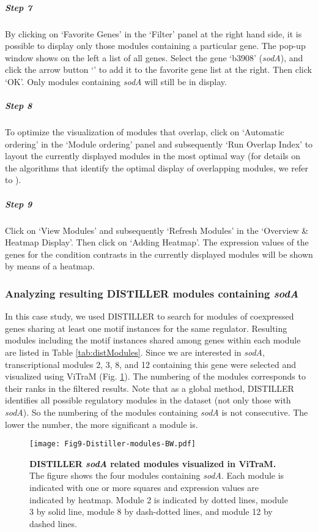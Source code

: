 \begin{small}
\subparagraph{Step 7} By clicking on `Favorite Genes' in the `Filter' panel 
at the right hand side, it is possible to display only those modules containing
a particular gene.
%
The pop-up window shows on the left a list of all genes. Select the gene
`b3908' (\textit{sodA}), and click the arrow button `\textrightarrow' to add it
to the favorite gene list at the right.  Then click `OK'.  Only modules
containing \textit{sodA} will still be in display.

\subparagraph{Step 8} To optimize the visualization of modules that overlap, 
click on `Automatic ordering' in the `Module ordering' panel and subsequently
`Run Overlap Index' to layout the currently displayed modules in the most
optimal way (for details on the algorithms that identify the optimal display of
overlapping modules, we refer to \cite{Sun2009}).

\subparagraph{Step 9} Click on `View Modules' and subsequently `Refresh 
Modules' in the `Overview \& Heatmap Display'. Then click on `Adding Heatmap'. 
The expression values of the genes for the condition contrasts in the currently 
displayed modules will be shown by means of a heatmap.

\end{small} %


\subsubsection{Analyzing resulting DISTILLER modules containing \textit{sodA}}

In this case study, we used DISTILLER to search for modules of coexpressed
genes sharing at least one motif instances for the same regulator.  Resulting
modules including the motif instances shared among genes within each module are
listed in Table \ref{tab:distModules}.  Since we are interested in
\textit{sodA}, transcriptional modules 2, 3, 8, and 12 containing this gene
were selected and visualized using ViTraM (Fig. \ref{fig:vitram}).  
%
The numbering of the modules corresponds to their ranks in the filtered
results. Note that as a global method, DISTILLER identifies all possible
regulatory modules in the dataset (not only those with \textit{sodA}). So the
numbering of the modules containing \textit{sodA} is not consecutive. The lower
the number, the more significant a module is.

\begin{figure}[b]
	\centering
  	\texttt{[image: Fig9-Distiller-modules-BW.pdf]}
	\caption[DISTILLER \textit{sodA} related modules visualized in ViTraM] 
	{\textbf{DISTILLER \textit{sodA} related modules visualized in ViTraM.}
	The figure shows the four modules containing \textit{sodA}. Each module is 
	indicated with one or more squares and expression values are indicated by 
	heatmap. Module 2 is indicated by dotted lines, module 3 by solid line, 
	module 8 by dash-dotted lines, and module 12 by dashed lines.}
	\label{fig:vitram}
\end{figure}

